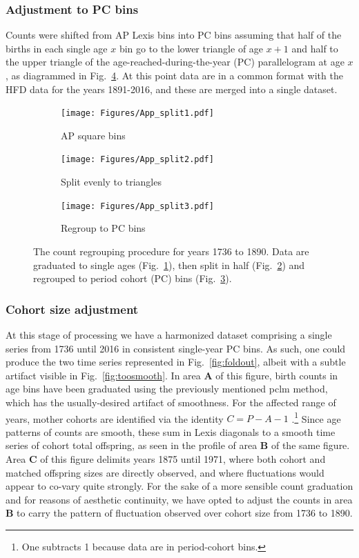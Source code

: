 \subsubsection{Adjustment to PC bins}
Counts were shifted from AP Lexis bins into PC bins assuming that half of the births in each single age $x$ bin go to the lower triangle of age $x+1$ and half to the upper triangle of the age-reached-during-the-year (PC) parallelogram at age $x$, as diagrammed in Fig.~\ref{fig:AP2PC}. At this point data are in a common format with the HFD data for the years 1891-2016, and these are merged into a single dataset.

\begin{figure}[ht!]
\centering
\begin{subfigure}{.3\textwidth}
\centering
\texttt{[image: Figures/App\_split1.pdf]}
\caption{AP square bins}
\label{fig:app1}
\end{subfigure}%
		\begin{subfigure}{.3\textwidth}
\centering
\texttt{[image: Figures/App\_split2.pdf]}
\caption{Split evenly to triangles}
\label{fig:app2}
\end{subfigure}
\begin{subfigure}{.3\textwidth}
\centering
\texttt{[image: Figures/App\_split3.pdf]}
\caption{Regroup to PC bins}
\label{fig:app3}
\end{subfigure}
\caption{The count regrouping procedure for years 1736 to 1890. Data are graduated to single ages (Fig.~\ref{fig:app1}), then split in half (Fig.~\ref{fig:app2}) and regrouped to period cohort (PC) bins (Fig.~\ref{fig:app3}).}
\label{fig:AP2PC}
\end{figure}

\FloatBarrier
\subsubsection{Cohort size adjustment}
\label{sec:cohadj}
At this stage of processing we have a harmonized dataset comprising a single series from 1736 until 2016 in consistent single-year PC bins. As such, one could produce the two time series represented in Fig.~\ref{fig:foldout}, albeit with a subtle artifact visible in Fig.~\ref{fig:toosmooth}. In area \textbf{A} of this figure, birth counts in age bins have been graduated using the previously mentioned pclm method, which has the usually-desired artifact of smoothness. For the affected range of years, mother cohorts are identified via the identity $C = P - A - 1$ .\footnote{One subtracts 1 because data are in period-cohort bins.} Since age patterns of counts are smooth, these sum in Lexis diagonals to a smooth time series of cohort total offspring, as seen in the profile of area \textbf{B} of the same figure. Area \textbf{C} of this figure delimits years 1875 until 1971, where both cohort and matched offspring sizes are directly observed, and where fluctuations would appear to co-vary quite strongly. For the sake of a more sensible count graduation and for reasons of aesthetic continuity, we have opted to adjust the counts in area \textbf{B} to carry the pattern of fluctuation observed over cohort size from 1736 to 1890.

